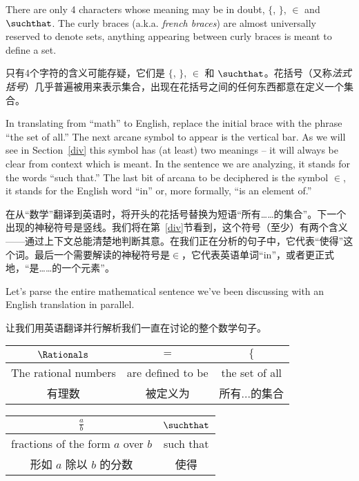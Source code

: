There are only 4 
characters whose meaning may be in doubt, $\{$, $\}$, $\in$ and $\suchthat$. The curly braces (a.k.a. {\em french braces}) are almost universally
reserved to denote sets, anything appearing between curly braces is 
meant to define a set.

只有4个字符的含义可能存疑，它们是 $\{$, $\}$, $\in$ 和 $\suchthat$。花括号（又称{\em 法式括号}）几乎普遍被用来表示集合，出现在花括号之间的任何东西都意在定义一个集合。

In translating from ``math'' to English,
replace the initial brace with the phrase ``the set of all.''  The 
next arcane symbol to appear is the vertical bar. As we will see in
Section~\ref{div} this symbol has (at least) two meanings -- it will
always be clear from context which is meant. In the sentence we are
analyzing, it stands for the words ``such that.''  The last bit of
arcana to be deciphered is the symbol $\in$, it stands for the English
word ``in'' or, more formally, ``is an element of.''

在从“数学”翻译到英语时，将开头的花括号替换为短语“所有……的集合”。下一个出现的神秘符号是竖线。我们将在第~\ref{div}节看到，这个符号（至少）有两个含义——通过上下文总能清楚地判断其意。在我们正在分析的句子中，它代表“使得”这个词。最后一个需要解读的神秘符号是$\in$，它代表英语单词“in”，或者更正式地，“是……的一个元素”。

Let's parse the entire mathematical sentence we've been discussing
with an English translation in parallel.

让我们用英语翻译并行解析我们一直在讨论的整个数学句子。

\vspace{.2in}

\begin{tabular}{c|c|c}
\rule[-10pt]{0pt}{22pt} $\Rationals$ & $=$ & $\{$  \\ \hline
\rule[-6pt]{0pt}{22pt} The rational numbers & are defined to be & the set of all\\
\rule[-6pt]{0pt}{22pt} 有理数 & 被定义为 & 所有...的集合\\
\end{tabular}

\vspace{.2in}

\begin{tabular}{c|c}
\rule[-10pt]{0pt}{22pt} $\displaystyle \frac{a}{b}$ & $\suchthat$ \\ \hline
\rule[-6pt]{0pt}{22pt} fractions of the form $a$ over $b$ & such that \\
\rule[-6pt]{0pt}{22pt} 形如 $a$ 除以 $b$ 的分数 & 使得 \\
\end{tabular}


